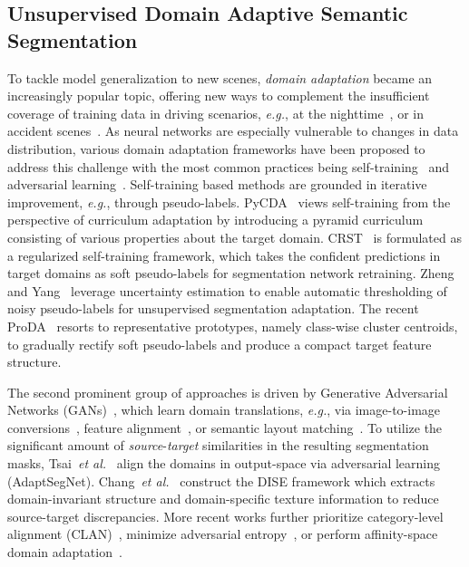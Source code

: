 \documentclass[journal]{IEEEtran}
\begin{document}
\subsection{Unsupervised Domain Adaptive Semantic Segmentation}
To tackle model generalization to new scenes, \emph{domain adaptation} became an increasingly popular topic, offering new ways to complement the insufficient coverage of training data in driving scenarios, \textit{e.g.}, at the nighttime~\cite{bridging,see_clearer_at_night,nighttime_road_scene_parsing,rainy_night},
or in accident scenes~\cite{issafe}.
As neural networks are especially vulnerable to changes in data distribution, various domain adaptation frameworks have been proposed to  address this challenge with the  most common practices being self-training~\cite{curriculum_da,pycda,crst,rectifying,proda} and adversarial learning~\cite{adaptsegnet,all_about_structure,fcnsinthewild,cycada,clan}. 
Self-training based  methods are grounded in iterative improvement, \textit{e.g.}, through pseudo-labels.
PyCDA~\cite{pycda} views self-training from the perspective of curriculum adaptation by introducing a pyramid curriculum consisting of various properties about the target domain. 
CRST~\cite{crst} is formulated as a regularized self-training framework, which takes the confident predictions in target domains as soft pseudo-labels for segmentation network retraining.
Zheng and Yang~\cite{rectifying} leverage uncertainty estimation to enable automatic thresholding of noisy pseudo-labels for unsupervised segmentation adaptation.
The recent ProDA~\cite{proda} resorts to representative prototypes, namely class-wise cluster centroids, to gradually rectify soft pseudo-labels and produce a compact target feature structure.

The second prominent group of approaches is driven by Generative Adversarial Networks (GANs)~\cite{gan}, which learn domain translations, \textit{e.g.}, via image-to-image conversions~\cite{bridging,see_clearer_at_night,cycada}, feature alignment~\cite{fcnsinthewild}, or semantic layout matching~\cite{adaptsegnet,all_about_structure,content_consistent_matching_da,contextual_relation_consistent_da}.
To utilize the significant amount of \textit{source}-\textit{target} similarities in the resulting segmentation masks, Tsai~\textit{et al.}~\cite{adaptsegnet} align the domains in output-space via adversarial learning (AdaptSegNet).
Chang~\textit{et al.}~\cite{all_about_structure} construct the DISE framework which extracts domain-invariant structure and domain-specific texture information to reduce source-target discrepancies.
More recent works further prioritize category-level alignment (CLAN)~\cite{clan}, minimize adversarial entropy~\cite{advent}, or perform affinity-space domain adaptation~\cite{affinity_space_da}.
\end{document}
